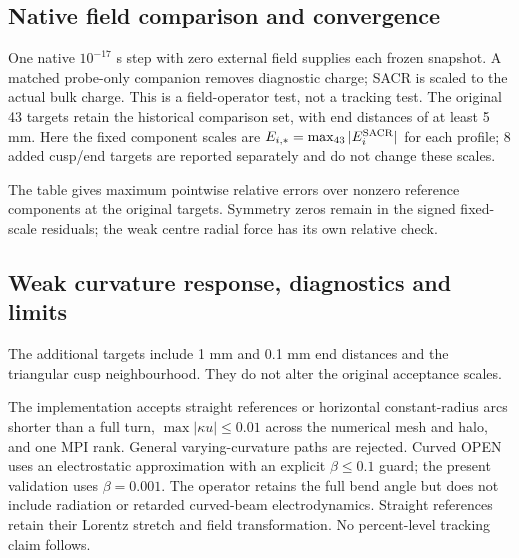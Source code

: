 \clearpage
\subsection{Native field comparison and convergence}
One native $10^{-17}$ s step with zero external field supplies each frozen
snapshot. A matched probe-only companion removes diagnostic charge; SACR is
scaled to the actual bulk charge. This is a field-operator test, not a tracking
test. The original 43 targets retain the historical comparison set, with
end distances of at least 5 mm. Here the
fixed component scales are $E_{i,*}=\max_{43}|E_i^{\rm SACR}|$ for each profile;
8 added cusp/end targets are reported separately and do not change these scales.

The table gives maximum pointwise relative errors over nonzero reference
components at the original targets. Symmetry zeros remain in the signed
fixed-scale residuals; the weak centre radial force has its own relative check.



\clearpage
\subsection{Weak curvature response, diagnostics and limits}
The additional targets include 1 mm and 0.1 mm end distances and the triangular
cusp neighbourhood. They do not alter the original acceptance scales.

The implementation accepts straight references or horizontal constant-radius
arcs shorter than a full turn, $\max|\kappa u|\le0.01$ across the numerical
mesh and halo, and one MPI rank. General varying-curvature paths are rejected.
Curved OPEN uses an electrostatic approximation with an explicit
$\beta\le0.1$ guard; the present validation uses $\beta=0.001$.
The operator retains the full bend angle but does not include radiation or
retarded curved-beam electrodynamics. Straight references retain their Lorentz
stretch and field transformation. No percent-level tracking claim follows.
